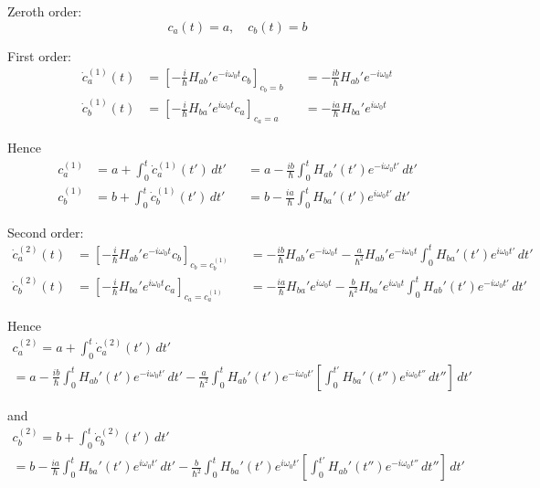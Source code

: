 


Zeroth order:
\begin{equation*}
c_a(t)=a,\quad c_b(t)=b
\end{equation*}

First order:
\begin{equation*}
\begin{aligned}
\dot c_a^{(1)}(t)&=\left[-\frac{i}{\hbar}H_{ab}'e^{-i\omega_0t}c_b\right]_{c_b=b}
&&=-\frac{ib}{\hbar}H_{ab}'e^{-i\omega_0t}
\\
\dot c_b^{(1)}(t)&=\left[-\frac{i}{\hbar}H_{ba}'e^{i\omega_0t}c_a\right]_{c_a=a}
&&=-\frac{ia}{\hbar}H_{ba}'e^{i\omega_0t}
\end{aligned}
\tag{1}
\end{equation*}

Hence
\begin{equation*}
\begin{aligned}
c_a^{(1)}&=a+\int_0^t\dot c_a^{(1)}(t')\,dt'
& &=a-\frac{ib}{\hbar}\int_0^tH_{ab}'(t')e^{-i\omega_0t'}\,dt'
\\
c_b^{(1)}&=b+\int_0^t\dot c_b^{(1)}(t')\,dt'
& &=b-\frac{ia}{\hbar}\int_0^tH_{ba}'(t')e^{i\omega_0t'}\,dt'
\end{aligned}
\tag{2}
\end{equation*}

Second order:
\begin{equation*}
\begin{aligned}
\dot c_a^{(2)}(t)&=\left[-\frac{i}{\hbar}H_{ab}'e^{-i\omega_0t}c_b\right]_{c_b=c_b^{(1)}}
&&=-\frac{ib}{\hbar}H_{ab}'e^{-i\omega_0t}-\frac{a}{\hbar^2}H_{ab}'e^{-i\omega_0t}
\int_0^tH_{ba}'(t')e^{i\omega_0t'}\,dt'
\\
\dot c_b^{(2)}(t)&=\left[-\frac{i}{\hbar}H_{ba}'e^{i\omega_0t}c_a\right]_{c_a=c_a^{(1)}}
&&=-\frac{ia}{\hbar}H_{ba}'e^{i\omega_0t}-\frac{b}{\hbar^2}H_{ba}'e^{i\omega_0t}
\int_0^tH_{ab}'(t')e^{-i\omega_0t'}\,dt'
\end{aligned}
\tag{3}
\end{equation*}

Hence
\begin{multline*}
c_a^{(2)}=a+\int_0^t\dot c_a^{(2)}(t')\,dt'
\\
=a-\frac{ib}{\hbar}\int_0^tH_{ab}'(t')e^{-i\omega_0t'}\,dt'
-\frac{a}{\hbar^2}\int_0^tH_{ab}'(t')e^{-i\omega_0t'}
\left[\int_0^{t'}H_{ba}'(t'')e^{i\omega_0t''}\,dt''\right]\,dt'
\tag{4}
\end{multline*}

and
\begin{multline*}
c_b^{(2)}=b+\int_0^t\dot c_b^{(2)}(t')\,dt'
\\
=b-\frac{ia}{\hbar}\int_0^tH_{ba}'(t')e^{i\omega_0t'}\,dt'
-\frac{b}{\hbar^2}\int_0^tH_{ba}'(t')e^{i\omega_0t'}
\left[\int_0^{t'}H_{ab}'(t'')e^{-i\omega_0t''}\,dt''\right]\,dt'
\tag{5}
\end{multline*}



